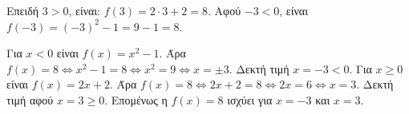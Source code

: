 
\begin{alist}
\item Επειδή $3 > 0$, είναι: $f(3) = 2 \cdot 3 + 2 = 8$.
Αφού $-3 < 0$, είναι $f(-3) = (-3)^2 - 1 = 9 - 1 = 8$.

\item Για $x < 0$ είναι $f(x) = x^2 - 1$.
Άρα $f(x) = 8 \Leftrightarrow x^2 - 1 = 8 \Leftrightarrow x^2 = 9 \Leftrightarrow x = \pm 3$. Δεκτή τιμή $x = -3 < 0$.
Για $x \ge 0$ είναι $f(x) = 2x + 2$.
Άρα $f(x) = 8 \Leftrightarrow 2x + 2 = 8 \Leftrightarrow 2x = 6 \Leftrightarrow x = 3$. Δεκτή τιμή αφού $x = 3 \ge 0$.
Επομένως η $f(x) = 8$ ισχύει για $x = -3$ και $x = 3$.
\end{alist}


